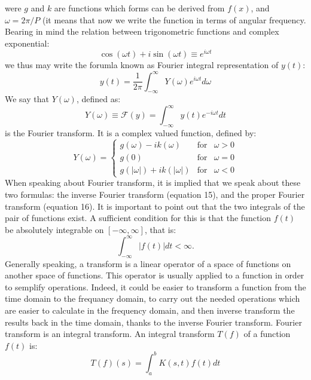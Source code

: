\documentclass{article}
\begin{document}
were $g$ and $k$ are functions which forms can be derived from $f(x)$, and $\omega=2\pi/P$ (it means that now we write the function in terms of angular frequency. Bearing in mind the relation between trigonometric functions and complex exponential:
\begin{equation}
\cos(\omega t)+i \sin(\omega t) \equiv e^{i\omega t}
\end{equation}
we thus may write the forumla known as Fourier integral representation of $y(t)$:
\begin{equation}
y(t)=\frac{1}{2\pi}\int_{-\infty}^{\infty} Y(\omega)e^{i\omega t} d\omega
\end{equation}
We say that $Y(\omega)$, defined as:
\begin{equation}
Y(\omega)\equiv \mathcal{F}(y)=\int_{-\infty}^{\infty} y(t)e^{-i\omega t} dt
\end{equation}
is the Fourier transform. It is a complex valued function, defined by:
\begin{equation}
Y(\omega) = \left\{ \begin{array}{rcl}
{{g(\omega)-ik(\omega)}} & \mbox{for}
& \omega>0 \\ g(0) & \mbox{for} & \omega=0 \\
{{g(|\omega|)+ik(|\omega|)}} & \mbox{for} & \omega<0
\end{array}\right.
\end{equation}
When speaking about Fourier transform, it is implied that we speak about these two formulas: the inverse Fourier transform (equation 15), and the proper Fourier transform (equation 16). It is important to point out that the two integrals of the pair of functions exist. A sufficient condition for this is that the function $f(t)$ be absolutely integrable on $[-\infty,\infty]$, that is:
\begin{equation}
\int_{-\infty}^{\infty}|f(t)|dt<\infty.
\end{equation}
Generally speaking, a transform is a linear operator of a space of functions on another space of functions. This operator is usually applied to a function in order to semplify operations. Indeed, it could be easier to transform a function from the time domain to the frequancy domain, to carry out the needed operations which are easier to calculate in the frequency domain, and then inverse transform the results back in the time domain, thanks to the inverse Fourier transform. Fourier transform is an integral transform. An integral transform $T(f)$ of a function $f(t)$ is:
\begin{equation}
T(f)(s)=\int_{a}^{b}K(s,t)f(t)dt
\end{equation}
\end{document}
